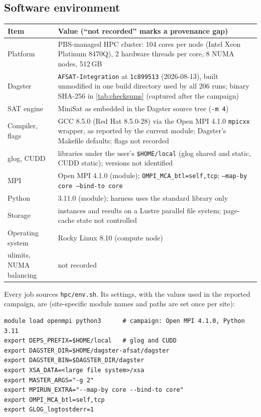 \documentclass[11pt,a4paper]{article}
\newcommand{\opt}[1]{\texttt{#1}}
\begin{document}
\subsection{Software environment}
\begin{center}\small
\begin{tabular}{@{}p{}p{}@{}}
\toprule
Item & Value (``not recorded'' marks a provenance gap) \\
\midrule
Platform & PBS-managed HPC cluster: 104 cores per node (Intel Xeon Platinum 8470Q), 2 hardware threads per core, 8 NUMA nodes, 512\,GB \\
Dagster & \texttt{AFSAT-Integration} at \texttt{1c899513} (2026-08-13), built unmodified in one build directory used by all 206 runs; binary SHA-256 in \cref{tab:checksums} (captured after the campaign) \\
SAT engine & MiniSat as embedded in the Dagster source tree (\opt{-m 4}) \\
Compiler, flags & GCC 8.5.0 (Red Hat 8.5.0-28) via the Open MPI 4.1.0 \texttt{mpicxx} wrapper, as reported by the current module; Dagster's Makefile defaults; flags not recorded \\
glog, CUDD & libraries under the user's \texttt{\$HOME/local} (glog shared and static, CUDD static); versions not identified \\
MPI & Open MPI 4.1.0 (module); \texttt{OMPI\_MCA\_btl=self,tcp}; \texttt{--map-by core --bind-to core} \\
Python & 3.11.0 (module); harness uses the standard library only \\
Storage & instances and results on a Lustre parallel file system; page-cache state not controlled \\
Operating system & Rocky Linux 8.10 (compute node) \\
ulimits, NUMA balancing & not recorded \\
\bottomrule
\end{tabular}
\end{center}
Every job sources \texttt{hpc/env.sh}. Its settings, with the values used in the reported
campaign, are (site-specific module names and paths are set once per site):
\begin{verbatim}
module load openmpi python3      # campaign: Open MPI 4.1.0, Python 3.11
export DEPS_PREFIX=$HOME/local   # glog and CUDD
export DAGSTER_DIR=$HOME/dagster-afsat/dagster
export DAGSTER_BIN=$DAGSTER_DIR/dagster
export XSA_DATA=<large file system>/xsa
export MASTER_ARGS="-g 2"
export MPIRUN_EXTRA="--map-by core --bind-to core"
export OMPI_MCA_btl=self,tcp
export GLOG_logtostderr=1
\end{verbatim}
\end{document}
